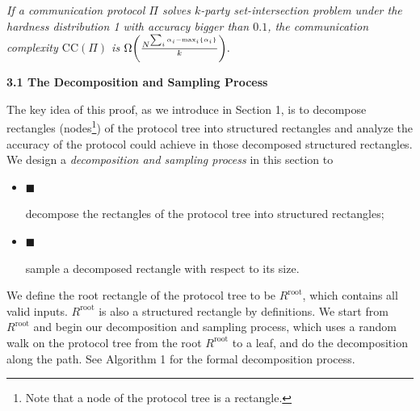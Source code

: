 \emph{If a communication protocol $\Pi$ solves $k$-party set-intersection problem under the hardness distribution 1 with accuracy bigger than $0.1$, the communication complexity $\text{CC}(\Pi)$ is $\Omega\bigg{(}\frac{N^{\sum_{i}\alpha_{i}-\mathop{\max}_{i}\{\alpha_{i}\}}}{k}\bigg{)}.$}\par






\par\medskip\noindent\textbf{
3.1 The Decomposition and Sampling Process}\par




The key idea of this proof, as we introduce in Section 1, is to decompose rectangles (nodes\footnote{Note that a node of the protocol tree is a rectangle.}) of the protocol tree into structured rectangles and analyze the accuracy of the protocol could achieve in those decomposed structured rectangles. We design a \emph{decomposition and sampling process} in this section to\par


\begin{itemize}


\item[] 
$\blacksquare$ 


decompose the rectangles of the protocol tree into structured rectangles;\par





\item[] 
$\blacksquare$ 


sample a decomposed rectangle with respect to its size.\par





\end{itemize}


We define the root rectangle of the protocol tree to be $R^{\text{root}}$, which contains all valid inputs. $R^{\text{root}}$ is also a structured rectangle by definitions. We start from $R^{\text{root}}$ and begin our decomposition and sampling process, which uses a random walk on the protocol tree from the root $R^{\text{root}}$ to a leaf, and do the decomposition along the path. See Algorithm 1 for the formal decomposition process.\par


